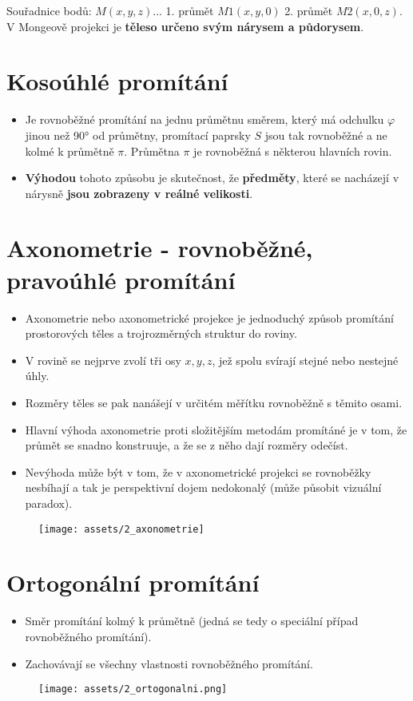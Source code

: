 Souřadnice bodů: $M(x, y, z)$... 1. průmět $M1 (x, y, 0)$ 2. průmět $M2 (x, 0, z)$. V Mongeově projekci je\textbf{ těleso určeno svým nárysem a půdorysem}.
\section{Kosoúhlé promítání}
\begin{itemize}
    \item Je rovnoběžné promítání na jednu průmětnu směrem, který má odchulku $\varphi$ jinou než \ang{90} od průmětny, promítací paprsky $S$ jsou tak rovnoběžné a ne kolmé k průmětně $\pi$. Průmětna $\pi$ je rovnoběžná s některou hlavních rovin.
    \item \textbf{Výhodou} tohoto způsobu je skutečnost, že \textbf{předměty}, které se nacházejí v nárysně \textbf{jsou zobrazeny v reálné velikosti}.
\end{itemize}

\section{Axonometrie - rovnoběžné, pravoúhlé promítání}
\begin{itemize}
    \item Axonometrie nebo axonometrické projekce je jednoduchý způsob promítání prostorových těles a trojrozměrných struktur do roviny.
    \item V rovině se nejprve zvolí tři osy $x, y, z$, jež spolu svírají stejné nebo nestejné úhly.
    \item Rozměry těles se pak nanášejí v určitém měřítku rovnoběžně s těmito osami.
    \item Hlavní výhoda axonometrie proti složitějším metodám promítáné je v tom, že průmět se snadno konstruuje, a že se z něho dají rozměry odečíst.
    \item Nevýhoda může být v tom, že v axonometrické projekci se rovnoběžky nesbíhají a tak je perspektivní dojem nedokonalý (může působit vizuální paradox).
\end{itemize}

\begin{figure}[H]
    \centering
    \texttt{[image: assets/2\_axonometrie]}
\end{figure}
\section{Ortogonální promítání}
\begin{itemize}
    \item Směr promítání kolmý k průmětně (jedná se tedy o speciální případ rovnoběžného promítání).
    \item Zachovávají se všechny vlastnosti rovnoběžného promítání.
\end{itemize}
\begin{figure}[H]
    \centering
    \texttt{[image: assets/2\_ortogonalni.png]}
\end{figure}
